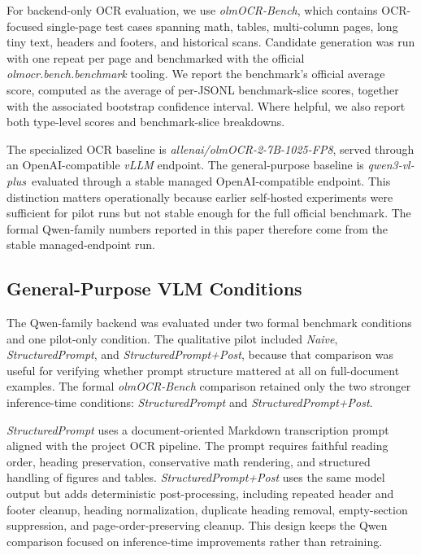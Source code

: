 \documentclass[conference]{IEEEtran}
\newcommand{\papername}[1]{\textit{#1}}
\newcommand{\qwen}{\papername{qwen3-vl-plus}}
\begin{document}
For backend-only OCR evaluation, we use \papername{olmOCR-Bench}, which contains OCR-focused single-page test cases spanning math, tables, multi-column pages, long tiny text, headers and footers, and historical scans. Candidate generation was run with one repeat per page and benchmarked with the official \papername{olmocr.bench.benchmark} tooling. We report the benchmark's official average score, computed as the average of per-JSONL benchmark-slice scores, together with the associated bootstrap confidence interval. Where helpful, we also report both type-level scores and benchmark-slice breakdowns.

The specialized OCR baseline is \papername{allenai/olmOCR-2-7B-1025-FP8}, served through an OpenAI-compatible \papername{vLLM} endpoint. The general-purpose baseline is \qwen\ evaluated through a stable managed OpenAI-compatible endpoint. This distinction matters operationally because earlier self-hosted experiments were sufficient for pilot runs but not stable enough for the full official benchmark. The formal Qwen-family numbers reported in this paper therefore come from the stable managed-endpoint run.

\subsection{General-Purpose VLM Conditions}

The Qwen-family backend was evaluated under two formal benchmark conditions and one pilot-only condition. The qualitative pilot included \papername{Naive}, \papername{StructuredPrompt}, and \papername{StructuredPrompt+Post}, because that comparison was useful for verifying whether prompt structure mattered at all on full-document examples. The formal \papername{olmOCR-Bench} comparison retained only the two stronger inference-time conditions: \papername{StructuredPrompt} and \papername{StructuredPrompt+Post}.

\papername{StructuredPrompt} uses a document-oriented Markdown transcription prompt aligned with the project OCR pipeline. The prompt requires faithful reading order, heading preservation, conservative math rendering, and structured handling of figures and tables. \papername{StructuredPrompt+Post} uses the same model output but adds deterministic post-processing, including repeated header and footer cleanup, heading normalization, duplicate heading removal, empty-section suppression, and page-order-preserving cleanup. This design keeps the Qwen comparison focused on inference-time improvements rather than retraining.
\end{document}
